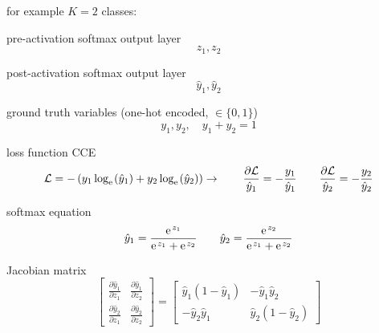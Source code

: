 \documentclass[mathserif, aspectratio=1610]{intbeamer}
\begin{document}
\begin{frame}
for example $K=2$ classes:

pre-activation softmax output layer $$z_1, z_2$$

post-activation softmax output layer $$\hat{y}_1, \hat{y}_2$$

ground truth variables (one-hot encoded, $\in\{0,1\}$) $$y_1, y_2,\quad y_1+y_2=1$$

loss function CCE
$$\mathcal{L} = -\left(y_1 \log_\e(\hat{y}_1) + y_2 \log_\e(\hat{y}_2)\right)
\rightarrow\qquad
\frac{\partial \mathcal{L}}{\hat{y}_1} = -\frac{y_1}{\hat{y}_1}
\qquad
\frac{\partial \mathcal{L}}{\hat{y}_2} = -\frac{y_2}{\hat{y}_2}
$$

softmax equation
$$
\hat{y}_1 = \frac{\e^{z_1}}{\e^{z_1}+\e^{z_2}}
\qquad
\hat{y}_2 = \frac{\e^{z_2}}{\e^{z_1}+\e^{z_2}}
$$

Jacobian matrix
$$
\begin{bmatrix}
\frac{\partial \hat{y}_1}{\partial z_1} & \frac{\partial \hat{y}_1}{\partial z_2}\\
\frac{\partial \hat{y}_2}{\partial z_1} & \frac{\partial \hat{y}_2}{\partial z_2}
\end{bmatrix}
=
\begin{bmatrix}
\hat{y}_1 (1-\hat{y}_1) & -\hat{y}_1 \hat{y}_2\\
-\hat{y}_2 \hat{y}_1 & \hat{y}_2 (1-\hat{y}_2)
\end{bmatrix}
$$
\end{frame}
\end{document}

